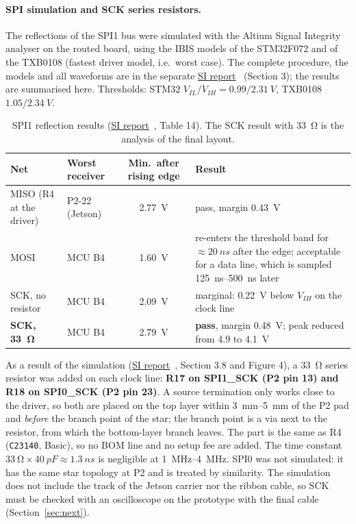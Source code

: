 \documentclass[11pt,a4paper]{article}
\newcommand{\sireport}{\href{run:BYTE_SPIne_SI_Simulation.pdf}{SI report}~\cite{si}}
\begin{document}
\paragraph{SPI simulation and SCK series resistors.} The reflections of the SPI1 bus were simulated
with the Altium Signal Integrity analyser on the routed board, using the IBIS models of the
STM32F072 and of the TXB0108 (fastest driver model, i.e.\ worst case). The complete procedure,
the models and all waveforms are in the separate \sireport{} (Section 3); the results are
summarised here. Thresholds: STM32 $V_{IL}/V_{IH} = 0.99/\qty{2.31}{V}$, TXB0108 $1.05/\qty{2.34}{V}$.

\begin{table}[H]
\centering
\begin{tabular}{llc>{\raggedright\arraybackslash}p{}}
\toprule
Net & Worst receiver & Min.\ after rising edge & Result \\
\midrule
MISO (R4 at the driver) & P2-22 (Jetson) & \qty{2.77}{V} & pass, margin \qty{0.43}{V} \\
MOSI & MCU B4 & \qty{1.60}{V} & re-enters the threshold band for $\approx\qty{20}{ns}$ after the edge; acceptable
for a data line, which is sampled \qtyrange{125}{500}{ns} later \\
SCK, no resistor & MCU B4 & \qty{2.09}{V} & marginal: \qty{0.22}{V} below $V_{IH}$ on the clock line \\
\textbf{SCK, \qty{33}{\ohm}} & MCU B4 & \qty{2.79}{V} & \textbf{pass}, margin \qty{0.48}{V}; peak reduced from 4.9 to \qty{4.1}{V} \\
\bottomrule
\end{tabular}
\caption{SPI1 reflection results (\sireport, Table 14). The SCK result with \qty{33}{\ohm} is the
analysis of the final layout.}
\label{tab:sires}
\end{table}

As a result of the simulation (\sireport, Section 3.8 and Figure 4), a \qty{33}{\ohm} series resistor
was added on each clock line: \textbf{R17 on SPI1\_SCK (P2 pin 13) and R18 on SPI0\_SCK
(P2 pin 23)}. A source termination only works close to the driver, so both are placed on the
top layer within \qtyrange{3}{5}{mm} of the P2 pad and \textit{before} the branch point of the star; the branch
point is a via next to the resistor, from which the bottom-layer branch leaves. The part is the
same as R4 (\texttt{C23140}, Basic), so no BOM line and no setup fee are added. The time constant
$\qty{33}{\ohm} \times \qty{40}{pF} \approx \qty{1.3}{ns}$ is negligible at \qtyrange{1}{4}{MHz}. SPI0 was not simulated: it has the same
star topology at P2 and is treated by similarity. The simulation does not include the track of
the Jetson carrier nor the ribbon cable, so SCK must be checked with an oscilloscope on the
prototype with the final cable (Section~\ref{sec:next}).
\end{document}

